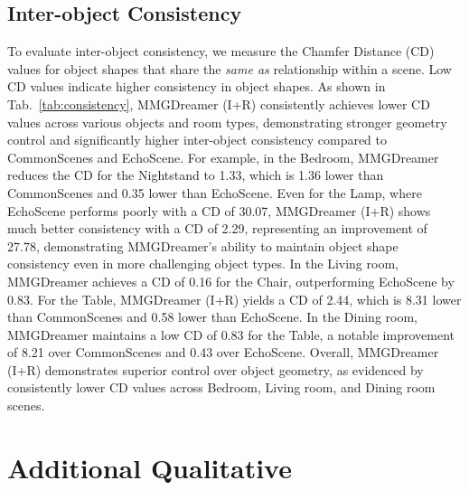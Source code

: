\subsection{Inter-object Consistency}
To evaluate inter-object consistency, we measure the Chamfer Distance (CD) values for object shapes that share the \textit{same as} relationship within a scene. Low CD values indicate higher consistency in object shapes. 
As shown in Tab.~\ref{tab:consistency}, MMGDreamer (I+R) consistently achieves lower CD values across various objects and room types, demonstrating stronger geometry control and significantly higher inter-object consistency compared to CommonScenes and EchoScene.
For example, in the Bedroom, MMGDreamer reduces the CD for the Nightstand to 1.33, which is 1.36 lower than CommonScenes and 0.35 lower than EchoScene. Even for the Lamp, where EchoScene performs poorly with a CD of 30.07, MMGDreamer (I+R) shows much better consistency with a CD of 2.29, representing an improvement of 27.78, demonstrating MMGDreamer's ability to maintain object shape consistency even in more challenging object types.
In the Living room, MMGDreamer achieves a CD of 0.16 for the Chair, outperforming EchoScene by 0.83. For the Table, MMGDreamer (I+R) yields a CD of 2.44, which is 8.31 lower than CommonScenes and 0.58 lower than EchoScene.
In the Dining room, MMGDreamer maintains a low CD of 0.83 for the Table, a notable improvement of 8.21 over CommonScenes and 0.43 over EchoScene.
Overall, MMGDreamer (I+R) demonstrates superior control over object geometry, as evidenced by consistently lower CD values across Bedroom, Living room, and Dining room scenes.
\section{Additional Qualitative}
\label{sec:More Qualitative Results}

